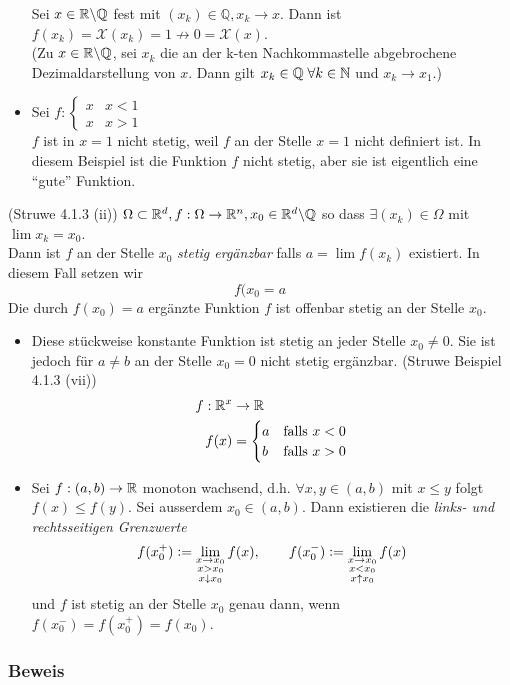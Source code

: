 \begin{itemize}
Sei $x\in\mathbb{R}\backslash\mathbb{Q}$ fest mit $(x_{k})\in\mathbb{Q}, x_{k}\to x$. Dann ist ${f(x_{k})=\mathcal{X}(x_{k})=1 \nrightarrow 0=\mathcal{X}(x)}$. \\
(Zu $x\in\mathbb{R}\backslash\mathbb{Q}$, sei $x_{k}$ die an der k-ten Nachkommastelle abgebrochene Dezimaldarstellung von $x$. Dann gilt $x_{k} \in \mathbb{Q}\; \forall k \in \mathbb{N}$ und $x_{k}\to x_{1}$.)
\item Sei $f: \begin{cases} x &x < 1 \\x &x>1 \end{cases}$ \\

 $f$ ist in $x=1$ nicht stetig, weil $f$ an der Stelle $x=1$ nicht definiert ist. In diesem Beispiel ist die Funktion $f$ nicht stetig, aber sie ist eigentlich eine ``gute'' Funktion.

\end{itemize}
\begin{definition}{(Struwe 4.1.3 (ii))}
$\Omega \subset \mathbb{R}^{d}, f:\Omega\to\mathbb{R}^{n}, x_{0}\in\mathbb{R}^{d}\backslash\mathbb{Q}$ so dass $\exists (x_{k})\in\Omega$ mit $\lim{x_{k}=x_{0}}$. \\

Dann ist $f$ an der Stelle $x_{0}$ \emph{stetig ergänzbar} falls $a=\lim{f(x_{k})}$ existiert. In diesem Fall setzen wir \[ f(x_{0} = a\]
Die durch $f(x_{0})=a$ ergänzte Funktion $f$ ist offenbar stetig an der Stelle $x_{0}$.
\end{definition}

\begin{itemize}
\item Diese stückweise konstante Funktion ist stetig an jeder Stelle $x_{0} \neq 0$. Sie ist jedoch für $a\neq b$ an der Stelle $x_{0}=0$ nicht stetig ergänzbar. (Struwe Beispiel 4.1.3 (vii))
\begin{align*}f:\mathbb{R}^{x}&\to\mathbb{R} \\ f(x)&=\begin{cases}a &\text{falls } x<0 \\ b &\text{falls } x>0\end{cases} \end{align*}
\item Sei $f:(a,b)\to\mathbb{R}$ monoton wachsend, d.h. $\forall x,y\in(a,b)$ mit $x\leq y$ folgt $f(x)\leq f(y)$. Sei ausserdem $x_{0}\in (a,b)$. Dann existieren die \emph{links- und rechtsseitigen Grenzwerte} 
\[ f(x_{0}^{+}) \vcentcolon= \lim_{\substack{x\to x_{0} \\ x > x_{0} \\ x \downarrow x_{0}}}f(x), \quad\quad f(x_{0}^{-})\vcentcolon= \lim_{\substack{x\to x_{0} \\ x < x_{0} \\ x \uparrow x_{0}}}f(x) \]
und $f$ ist stetig an der Stelle $x_{0}$ genau dann, wenn $f(x_{0}^{-})=f(x_{0}^{+})=f(x_{0})$.
\end{itemize}
\subsubsection*{Beweis}